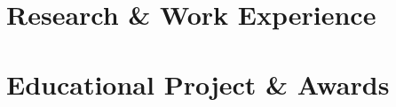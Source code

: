 \documentclass[letterpaper,11pt]{article}
\begin{document}
\headering
\education

\section{Research \& Work Experience}
\MetaPEBootcamper
\LabServerAndNetworkManager
\TeamLeadNetworkTeam
\PartTimeLinuxPC
\InternContainerPlatform
\InternBlockchain
\TAExperience

\section{Educational Project \& Awards}
\ProjectFGC
\NCTUCSCCIntranetInfrastructure
\Awards

\skills
\end{document}
